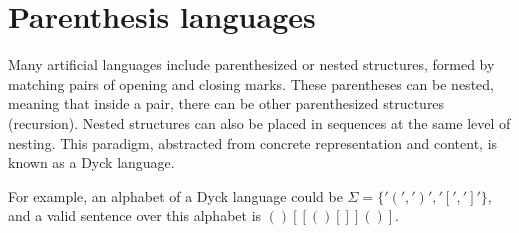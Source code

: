 \section{Parenthesis languages}

Many artificial languages include parenthesized or nested structures, formed by matching pairs of opening and closing marks. 
These parentheses can be nested, meaning that inside a pair, there can be other parenthesized structures (recursion). 
Nested structures can also be placed in sequences at the same level of nesting. 
This paradigm, abstracted from concrete representation and content, is known as a Dyck language. 
\begin{example}
    For example, an alphabet of a Dyck language could be $\Sigma=\{'(',')','[',']'\}$, and a valid sentence over this alphabet is $()[[()[]]()]$.
\end{example}